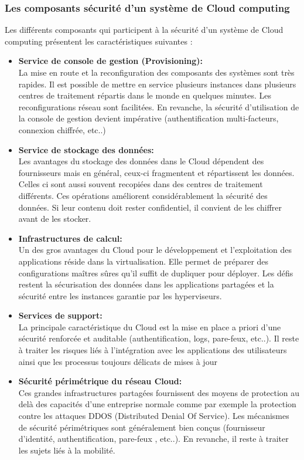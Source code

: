 \subsubsection{Les composants sécurité d’un système de Cloud computing}
Les différents composants qui participent à la sécurité d’un système de Cloud computing présentent les caractéristiques suivantes :
\begin{itemize}
	 
\item \textbf{Service de console de gestion (Provisioning):}\\
La mise en route et la reconfiguration des composants des systèmes sont très rapides. Il est possible de mettre en service plusieurs instances dans plusieurs centres de traitement répartis dans le monde en quelques minutes. Les reconfigurations réseau sont facilitées. En revanche, la sécurité d’utilisation de la console de gestion devient impérative (authentification multi-facteurs, connexion chiffrée, etc..)

\item \textbf{Service de stockage des données:}\\
Les avantages du stockage des données dans le Cloud dépendent des fournisseurs mais en général, ceux-ci fragmentent et répartissent les données. Celles ci sont aussi souvent recopiées dans des centres de traitement différents. Ces opérations améliorent considérablement la sécurité des données. Si leur contenu doit rester confidentiel, il convient de les chiffrer avant de les stocker.

\item \textbf{Infrastructures de calcul:}\\
Un des gros avantages du Cloud pour le développement et l’exploitation des applications réside dans la virtualisation. Elle permet de préparer des configurations maîtres sûres qu’il suffit de dupliquer pour déployer. Les défis restent la sécurisation des données dans les applications partagées et  la sécurité entre les instances garantie par les hyperviseurs.
\item \textbf{Services de support:}\\
La principale caractéristique du Cloud est la mise en place a priori d’une sécurité renforcée et auditable (authentification, logs, pare-feux, etc..). Il reste à traiter les risques liés à l’intégration avec les applications des utilisateurs ainsi que les processus toujours délicats de mises à jour
\item \textbf{Sécurité périmétrique du réseau Cloud:}\\
Ces grandes infrastructures partagées fournissent des moyens de protection au delà des capacités  d’une entreprise normale comme par exemple la protection contre les attaques DDOS (Distributed Denial Of Service). Les mécanismes de sécurité périmétriques sont généralement bien conçus (fournisseur d’identité, authentification, pare-feux , etc..). En revanche, il reste à traiter les sujets liés à la mobilité.

\end{itemize}

